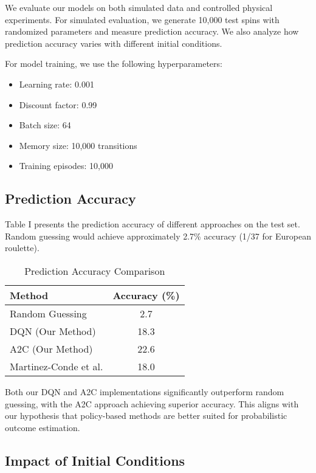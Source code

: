 \documentclass[conference]{IEEEtran}
\begin{document}
We evaluate our models on both simulated data and controlled physical experiments. For simulated evaluation, we generate 10,000 test spins with randomized parameters and measure prediction accuracy. We also analyze how prediction accuracy varies with different initial conditions.

For model training, we use the following hyperparameters:
\begin{itemize}
    \item Learning rate: 0.001
    \item Discount factor: 0.99
    \item Batch size: 64
    \item Memory size: 10,000 transitions
    \item Training episodes: 10,000
\end{itemize}

\subsection{Prediction Accuracy}

Table I presents the prediction accuracy of different approaches on the test set. Random guessing would achieve approximately 2.7\% accuracy (1/37 for European roulette).

\begin{table}[h]
\caption{Prediction Accuracy Comparison}
\begin{center}
\begin{tabular}{|l|c|}
\hline
\textbf{Method} & \textbf{Accuracy (\%)} \\
\hline
Random Guessing & 2.7 \\
DQN (Our Method) & 18.3 \\
A2C (Our Method) & 22.6 \\
Martinez-Conde et al. \cite{martinez2022prediction} & 18.0 \\
\hline
\end{tabular}
\end{center}
\end{table}

Both our DQN and A2C implementations significantly outperform random guessing, with the A2C approach achieving superior accuracy. This aligns with our hypothesis that policy-based methods are better suited for probabilistic outcome estimation.

\subsection{Impact of Initial Conditions}
\end{document}
